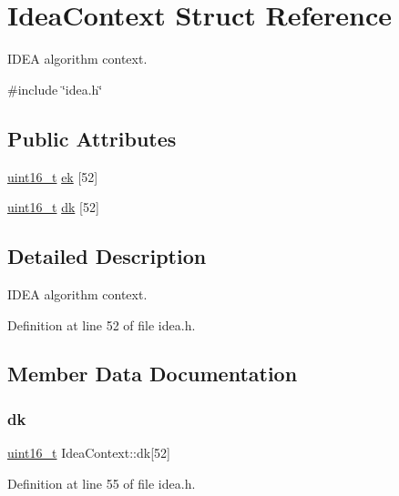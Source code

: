 \hypertarget{structIdeaContext}{}\section{Idea\+Context Struct Reference}
\label{structIdeaContext}


I\+D\+EA algorithm context.  




{\ttfamily \#include \char`\"{}idea.\+h\char`\"{}}

\subsection*{Public Attributes}
\begin{DoxyCompactItemize}
\item 
\hyperlink{stdint_8h_a273cf69d639a59973b6019625df33e30}{uint16\+\_\+t} \hyperlink{structIdeaContext_a5537bf543ce4153716021512e203e628}{ek} \mbox{[}52\mbox{]}
\item 
\hyperlink{stdint_8h_a273cf69d639a59973b6019625df33e30}{uint16\+\_\+t} \hyperlink{structIdeaContext_a6ec787b560b36a7b52245512a510ca6c}{dk} \mbox{[}52\mbox{]}
\end{DoxyCompactItemize}


\subsection{Detailed Description}
I\+D\+EA algorithm context. 

Definition at line 52 of file idea.\+h.



\subsection{Member Data Documentation}
\mbox{\label{structIdeaContext_a6ec787b560b36a7b52245512a510ca6c}} 
\subsubsection{\texorpdfstring{dk}{dk}}
{\footnotesize\ttfamily \hyperlink{stdint_8h_a273cf69d639a59973b6019625df33e30}{uint16\+\_\+t} Idea\+Context\+::dk\mbox{[}52\mbox{]}}



Definition at line 55 of file idea.\+h.

